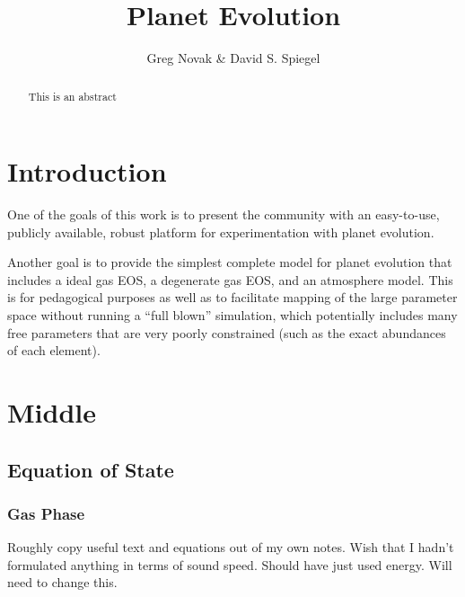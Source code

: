 \documentclass{emulateapj}
\begin{document}

\title{Planet Evolution}


\author{
%
Greg Novak \&
%
David S. Spiegel
}




\vspace{0.5\baselineskip}



\begin{abstract}
This is an abstract
\end{abstract}



\section{Introduction}
\label{sec:intro}
One of the goals of this work is to present the community with an
easy-to-use, publicly available, robust platform for experimentation
with planet evolution.

Another goal is to provide the simplest complete model for planet
evolution that includes a ideal gas EOS, a degenerate gas EOS, and an
atmosphere model.  This is for pedagogical purposes as well as to
facilitate mapping of the large parameter space without running a
``full blown'' simulation, which potentially includes many free
parameters that are very poorly constrained (such as the exact
abundances of each element).  

\section{Middle}

\label{sec:mid}

\subsection{Equation of State}

\subsubsection{Gas Phase}
Roughly copy useful text and equations out of my own notes.  Wish that
I hadn't formulated anything in terms of sound speed.  Should have
just used energy.  Will need to change this.
\end{document}
